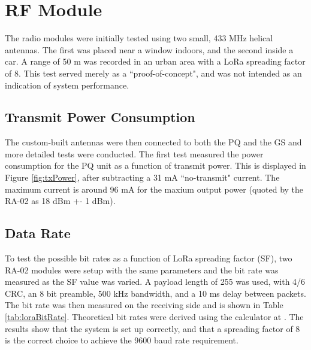 \graphicspath{{./figures}}

\section{RF Module}

The radio modules were initially tested using two small, 433 MHz helical antennas. The first was placed near a window indoors, and the second inside a car. A range of 50 m was recorded in an urban area with a LoRa spreading factor of 8. This test served merely as a ``proof-of-concept", and was not intended as an indication of system performance.

\subsection{Transmit Power Consumption}
The custom-built antennas were then connected to both the PQ and the GS and more detailed tests were conducted. The first test measured the power consumption for the PQ unit as a function of transmit power. This is displayed in Figure \ref{fig:txPower}, after subtracting a 31 mA ``no-transmit" current. The maximum current is around 96 mA for the maxium output power (quoted by the RA-02 as 18 dBm +- 1 dBm).

\subsection{Data Rate}
To test the possible bit rates as a function of LoRa spreading factor (SF), two RA-02 modules were setup with the same parameters and the bit rate was measured as the SF value was varied. A payload length of 255 was used, with 4/6 CRC, an 8 bit preamble, 500 kHz bandwidth, and a 10 ms delay between packets. The bit rate was then measured on the receiving side and is shown in Table \ref{tab:loraBitRate}. Theoretical bit rates were derived using the calculator at \cite{site-loraBitRateCalculator}. The results show that the system is set up correctly, and that a spreading factor of 8 is the correct choice to achieve the 9600 baud rate requirement.

